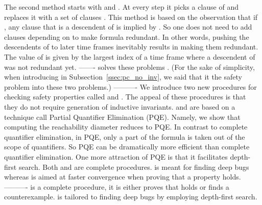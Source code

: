 The second method starts with  and .  At every step it
picks a clause of  and replaces it with a set of clauses
. This method is based on the observation that if , any clause  that is a descendent of  is
implied by . So one does not need to add
clauses depending on  to make formula  redundant. In
other words, pushing the descendents of  to later time frames
inevitably results in making them redundant. The value of  is
given by the largest index  of a time frame where a descendent of
 was not redundant yet.
-------
\FB solves these problems . (For the sake of simplicity,
when introducing \FB in Subsection~\ref{ssec:pc_no_inv}, we said that
it  the safety problem into these two problems.)
----------
We introduce two new procedures for checking safety properties called
\FB and \pp. The appeal of these procedures is that they do not
require generation of inductive invariants. \FB and \PP are based on a
technique call Partial Quantifier Elimination (PQE). Namely, we show
that computing the reachability diameter reduces to PQE. In contrast
to complete quantifier elimination, in PQE, only a part of the formula
is taken out of the scope of quantifiers. So PQE can be dramatically
more efficient than complete quantifier elimination. One more
attraction of PQE is that it facilitates depth-first search.  Both \FB
and \PP are complete procedures. \FB is meant for finding deep bugs
whereas \PP is aimed at faster convergence when proving that a
property holds.
----------
\FB is a complete procedure, it is either proves that 
holds or finds a counterexample. \FB is tailored to finding deep bugs
by employing depth-first search.

